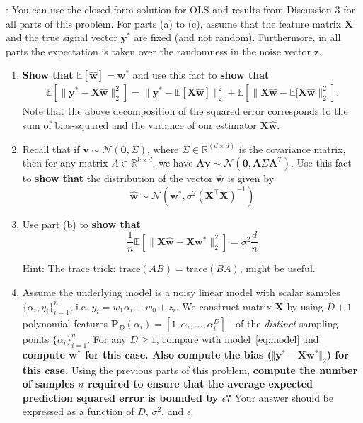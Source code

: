\documentclass{article}\usepackage[utf8]{inputenc}\usepackage[margin=0.4cm,top=0.4cm,bottom=0.4cm]{geometry}\usepackage[usenames,dvipsnames,svgnames,table]{xcolor}
\begin{document}
: You can use the closed form solution for OLS and results from Discussion 3 for all parts of this problem. For parts (a) to (c), assume that the feature matrix $\mathbf{X}$ and the true signal vector $\mathbf{y}^*$ are fixed (and not random). Furthermore, in all parts the expectation is taken over the randomness in the noise vector $\mathbf{z}$. 
\begin{enumerate}
\item {\bf Show that} $\mathbb{E}[\hat{\mathbf{w}}] = \mathbf{w}^*$ and use this fact to {\bf show that} \begin{align*}   \mathbb{E}\left[\| \mathbf{y}^* - \mathbf{X} \hat{\mathbf{w}} \|_2^2\right]   = \| \mathbf y^* - \mathbb{E}[\mathbf X \hat{\mathbf w}] \|_2^2 +   \mathbb{E}\left[\| \mathbf X \hat{\mathbf w}  - \mathbb{E}[\mathbf X \hat{\mathbf w}\|_2^2\right]. \end{align*} Note that the above decomposition of the squared error corresponds to the sum of bias-squared and the variance of our estimator $\mathbf X \hat{\mathbf w}$.
\BeginSolution

\EndSolution
\item Recall that if $\mathbf{v} \sim \mathcal{N}(\mathbf{0}, \Sigma)$, where $\Sigma \in \mathbb{R}^{(d \times d)}$ is the covariance matrix, then for any matrix $A \in \mathbb{R}^{k \times d}$, we have $\mathbf{A}\mathbf{v} \sim \mathcal{N}(\mathbf{0}, \mathbf{A}\Sigma\mathbf{A}^T)$. Use this fact to {\bf show that} the distribution of the vector $\hat{\mathbf{w}}$ is given by $$\hat{\mathbf{w}} \sim \mathcal{N}(\mathbf{w}^*, \sigma^2(\mathbf{X}^\top \mathbf{X})^{-1})$$
\BeginSolution

\EndSolution
\item Use part (b) to {\bf show that} $$\frac{1}{n} \mathbb{E} \left[ \| \mathbf{X} \hat{\mathbf{w}} - \mathbf{X} \mathbf w^* \|_2^2 \right] = \sigma^2 \frac{d}{n}$$
\vspace{4pt}

\noindent Hint: The trace trick: ${\mathrm{trace}}(AB) = {\mathrm{trace}}(BA)$, might be useful.
\BeginSolution

\EndSolution
\item Assume the underlying model is a noisy linear model with scalar samples $\{\alpha_i, y_i\}_{i=1}^n$, i.e. $y_i = w_1 \alpha_i + w_0 + z_i$. We construct matrix $\mathbf{X}$ by using $D+1$ polynomial features $\mathbf{P}_D(\alpha_i) = [1, \alpha_i, \ldots, \alpha_i^D]^\top$ of the \emph{distinct} sampling points $\{\alpha_i\}_{i=1}^n$. For any $D \geq 1$, compare with model~\eqref{eq:model} and {\bf compute $\mathbf{w}^*$ for this case. Also compute the bias ($\Vert \mathbf{y}^* - \mathbf{X} \mathbf{w}^*\Vert_2$) for this case.} Using the previous parts of this problem, {\bf compute the number of samples $n$ required to ensure that the average expected prediction squared error is bounded by $\epsilon$?} Your answer should be expressed as a function of $D$, $\sigma^2$, and $\epsilon$.
\vspace{4pt}


\end{enumerate}
\end{document}
